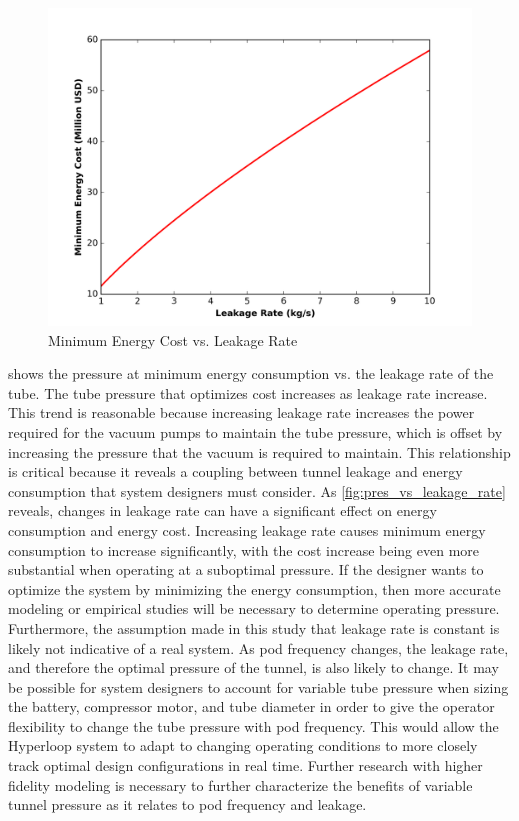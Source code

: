 \begin{figure}
	\centering
	\includegraphics{../../images/graphs/leakage_trades/leakage_vs_energy.png}
	\caption{Minimum Energy Cost vs. Leakage Rate}
	\label{fig:pres_vs_energy}
\end{figure}
 shows the pressure at minimum energy consumption vs. the leakage rate of the tube. The tube pressure that optimizes cost increases as leakage rate increase. This trend is reasonable because increasing leakage rate increases the power required for the vacuum pumps to maintain the tube pressure, which is offset by increasing the pressure that the vacuum is required to maintain. This relationship is critical because it reveals a coupling between tunnel leakage and energy consumption that system designers must consider. As \cref{fig:pres_vs_leakage_rate} reveals, changes in leakage rate can have a significant effect on energy consumption and energy cost. Increasing leakage rate causes minimum energy consumption to increase significantly, with the cost increase being even more substantial when operating at a suboptimal pressure. If the designer wants to optimize the system by minimizing the energy consumption, then more accurate modeling or empirical studies will be necessary to determine operating pressure. Furthermore, the assumption made in this study that leakage rate is constant is likely not indicative of a real system. As pod frequency changes, the leakage rate, and therefore the optimal pressure of the tunnel, is also likely to change. It may be possible for system designers to account for variable tube pressure when sizing the battery, compressor motor, and tube diameter in order to give the operator flexibility to change the tube pressure with pod frequency. This would allow the Hyperloop system to adapt to changing operating conditions to more closely track optimal design configurations in real time. Further research with higher fidelity modeling is necessary to further characterize the benefits of variable tunnel pressure as it relates to pod frequency and leakage.
